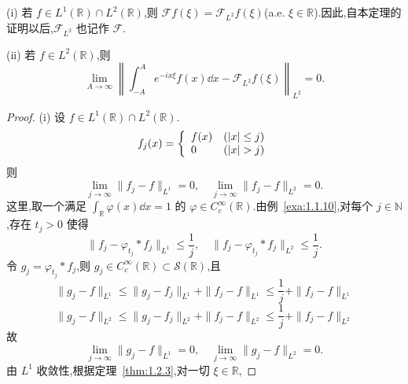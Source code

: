 \begin{theorem}\label{thm:1.2.16}
(i) 若 $f \in L^{1}(\mathbb{R}) \cap L^{2}(\mathbb{R})$,则 $\mathcal{F}f(\xi) = \mathcal{F}_{L^{2}}f(\xi)$(a.e. $\xi \in \mathbb{R}$).因此,自本定理的证明以后,$\mathcal{F}_{L^{2}}$ 也记作 $\mathcal{F}$.

(ii) 若 $f \in L^{2}(\mathbb{R})$,则
\begin{equation*}
\lim_{A \to \infty}\left\| \int_{-A}^{A} e^{-ix\xi}f(x)\dd x - \mathcal{F}_{L^{2}}f(\xi) \right\|_{L^{2}} = 0.
\end{equation*}
\end{theorem}

\begin{proof}
(i) 设 $f \in L^{1}(\mathbb{R}) \cap L^{2}(\mathbb{R})$.
\begin{equation*}
f_{j}(x) = \left\{ \begin{array}{l l}
f(x) & (|x| \leq j) \\
0 & (|x| > j)
\end{array} \right.
\end{equation*}
则
\begin{equation*}
\lim_{j \to \infty}\|f_{j} - f\|_{L^{1}} = 0, \quad \lim_{j \to \infty}\|f_{j} - f\|_{L^{2}} = 0.
\end{equation*}
这里,取一个满足 $\int_{\mathbb{R}}\varphi(x)\dd x = 1$ 的 $\varphi \in C_{c}^{\infty}(\mathbb{R})$.由例~\ref{exa:1.1.10},对每个 $j \in \mathbb{N}$,存在 $t_{j} > 0$ 使得
\begin{equation*}
\| f_{j} - \varphi_{t_{j}} * f_{j} \|_{L^{1}} \leq \frac{1}{j}, \quad \| f_{j} - \varphi_{t_{j}} * f_{j} \|_{L^{2}} \leq \frac{1}{j}.
\end{equation*}
令 $g_{j} = \varphi_{t_{j}} * f_{j}$,则 $g_{j} \in C_{c}^{\infty}(\mathbb{R}) \subset \mathcal{S}(\mathbb{R})$,且
\begin{equation*}
\| g_{j} - f \|_{L^{1}} \leq \| g_{j} - f_{j} \|_{L^{1}} + \| f_{j} - f \|_{L^{1}} \leq \frac{1}{j} + \| f_{j} - f \|_{L^{1}}
\end{equation*}
\begin{equation*}
\| g_{j} - f \|_{L^{2}} \leq \| g_{j} - f_{j} \|_{L^{2}} + \| f_{j} - f \|_{L^{2}} \leq \frac{1}{j} + \| f_{j} - f \|_{L^{2}}
\end{equation*}
故
\begin{equation*}
\lim_{j \to \infty}\| g_{j} - f \|_{L^{1}} = 0, \quad \lim_{j \to \infty}\| g_{j} - f \|_{L^{2}} = 0.
\end{equation*}
由 $L^{1}$ 收敛性,根据定理~\ref{thm:1.2.3},对一切 $\xi \in \mathbb{R}$,

\end{proof}
